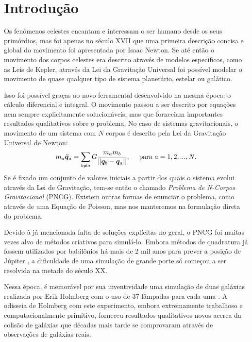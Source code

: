 \chapter{Introdução}

Os fenômenos celestes encantam e interessam o ser humano desde os seus primórdios, mas foi apenas no século XVII que uma primeira descrição concisa e global do movimento foi apresentada por Isaac Newton. Se até então o movimento dos corpos celestes era descrito através de modelos específicos, como as Leis de Kepler, através da Lei da Gravitação Universal foi possível modelar o movimento de quase qualquer tipo de sistema planetário, estelar ou galático.

Isso foi possível graças ao novo ferramental desenvolvido na mesma época: o cálculo diferencial e integral. O movimento passou a ser descrito por equações nem sempre explicitamente solucionáveis, mas que forneciam importantes resultados qualitativos sobre o problema. No caso de sistemas gravitacionais, o movimento de um sistema com $N$ corpos é descrito pela Lei da Gravitação Universal de Newton:
\begin{equation*}
    m_a \ddot {\bm q}_a = \sum_{b \neq a} G \dfrac{m_a m_b}{\left\Vert \bm q_b - \bm q_a \right\Vert},
    \quad \text{ para } a=1, 2, ..., N.
\end{equation*}
Se é fixado um conjunto de valores iniciais a partir dos quais o sistema evolui através da Lei de Gravitação, tem-se então o chamado \textit{Problema de N-Corpos Gravitacional} (PNCG). Existem outras formas de enunciar o problema, como através de uma Equação de Poisson, mas nos manteremos na formulação direta do problema.

Devido à já mencionada falta de soluções explícitas no geral, o PNCG foi muitas vezes alvo de métodos criativos para simulá-lo. Embora métodos de quadratura já fossem utilizados por babilônios há mais de 2 mil anos para prever a posição de Júpiter \citep{Ossendrijver2016}, a dificuldade de uma simulação de grande porte só começou a ser resolvida na metade do século XX.

Nessa época, é memorável por sua inventividade uma simulação de duas galáxias realizada por Erik Holmberg com o uso de 37 lâmpadas para cada uma \citep{Holmberg1941}. A odisseia de Holmberg com este experimento, embora extremamente trabalhoso e computacionalmente primitivo, forneceu resultados qualitativos novos acerca da colisão de galáxias que décadas mais tarde se comprovaram através de observações de galáxias reais.

